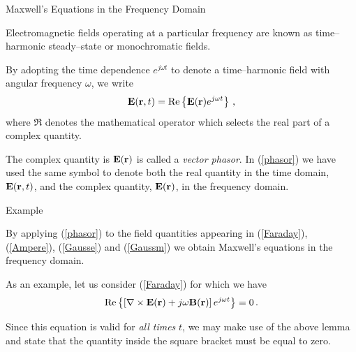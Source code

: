 \documentclass[handout,10pt]{beamer}
\begin{document}
\begin{frame}[fragile]{Maxwell's Equations in the Frequency Domain}

%
Electromagnetic fields operating at a particular frequency are known
as \alert{time--harmonic steady--state or monochromatic fields}. 

\pause
By adopting
the time dependence $e^{j\omega t}$ to denote a time--harmonic field
with angular frequency $\omega$, we write
%
\begin{equation}
{\mathbf{E}}({\mathbf{r}}, t) = \Re \left\{ {\mathbf{E}} ({\mathbf{r}})
e^{j\omega t} \right\}\,, \label{phasor}
\end{equation}
%
where $\Re$ denotes the mathematical operator which selects the real
part of a complex quantity. 

\pause
The complex quantity is
$\mathbf{E}(\mathbf{r})$ is called a \emph{vector phasor}. In (\ref{phasor}) we have used the same symbol to denote
both the real quantity in the time domain, ${\mathbf{E}}({\mathbf{r}},
t)$, and the complex quantity, ${\mathbf{E}} ({\mathbf{r}})$, in the
frequency domain. 




\end{frame}



\begin{frame}[fragile]{Example}

By applying (\ref{phasor}) to the field quantities appearing in
(\ref{Faraday}), (\ref{Ampere}), (\ref{Gausse}) and (\ref{Gaussm})
we obtain Maxwell's equations in the frequency domain. 
\pause

As an
example, let us consider (\ref{Faraday}) for which we have
%
\begin{equation}
\Re  \left\{ \left[ \nabla \times {\mathbf{E}}({\mathbf{r}}) +
  j \omega  {\mathbf{B}}({\mathbf{r}})  \right] e^{j\omega t} \right\}  =0
  \,.
\end{equation}
%

Since this equation is valid for {\em all times} $t$, we may make
use of the above lemma and state that the quantity inside the square
bracket must be equal to zero.

\end{frame}
\end{document}
